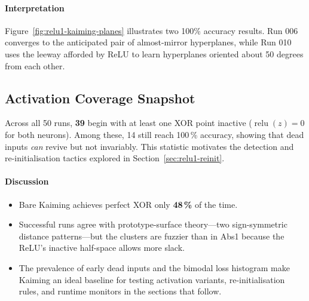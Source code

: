 \paragraph{Interpretation}
Figure~\ref{fig:relu1-kaiming-planes} illustrates two 100\% accuracy results. Run 006 converges to the anticipated pair of almost-mirror hyperplanes, while Run 010 uses the leeway afforded by ReLU to learn hyperplanes oriented about 50 degrees from each other.

\subsection*{Activation Coverage Snapshot}

Across all 50 runs, \textbf{39} begin with at least one XOR point inactive (\(\operatorname{relu}(z)=0\) for both neurons). 
Among these, 14 still reach 100\,\% accuracy, showing that dead inputs \emph{can} revive but not invariably.
This statistic motivates the detection and re-initialisation tactics explored in Section~\ref{sec:relu1-reinit}.

\paragraph{Discussion}
\begin{itemize}
  \item Bare Kaiming achieves perfect XOR only \textbf{48\,\%} of the time.
  \item Successful runs agree with prototype-surface theory—two sign-symmetric
        distance patterns—but the clusters are fuzzier than in Abs1 because
        the ReLU's inactive half-space allows more slack.
  \item The prevalence of early dead inputs and the bimodal loss histogram
        make Kaiming an ideal baseline for testing activation variants,
        re-initialisation rules, and runtime monitors in the sections that
        follow.
\end{itemize}

\hrulefill
